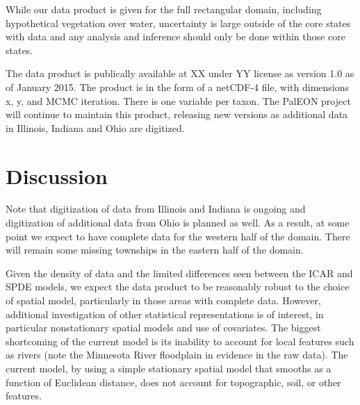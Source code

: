 \documentclass[12pt]{article}\usepackage[]{graphicx}\usepackage[]{color}
\begin{document}
While our data product is given for the full rectangular domain, including
hypothetical vegetation over water, uncertainty is large outside of
the core states with data and any analysis and inference should only
be done within those core states.

The data product is publically available at XX under YY license as
version 1.0 as of January 2015. The product is in the form of a netCDF-4
file, with dimensions x, y, and MCMC iteration. There is one variable
per taxon. The PalEON project will continue to maintain this product,
releasing new versions as additional data in Illinois, Indiana and
Ohio are digitized. 


\section{Discussion}

Note that digitization of data from Illinois and Indiana is ongoing
and digitization of additional data from Ohio is planned as well.
As a result, at some point we expect to have complete data for the
western half of the domain. There will remain some missing townships
in the eastern half of the domain. 

Given the density of data and the limited differences seen between
the ICAR and SPDE models, we expect the data product to be reasonably
robust to the choice of spatial model, particularly in those areas
with complete data. However, additional investigation of other statistical
representations is of interest, in particular nonstationary spatial
models and use of covariates. The biggest shortcoming of the current
model is its inability to account for local features such as rivers
(note the Minnesota River floodplain in evidence in the raw data).
The current model, by using a simple stationary spatial model that
smooths as a function of Euclidean distance, does not account for
topographic, soil, or other features. 
\end{document}

